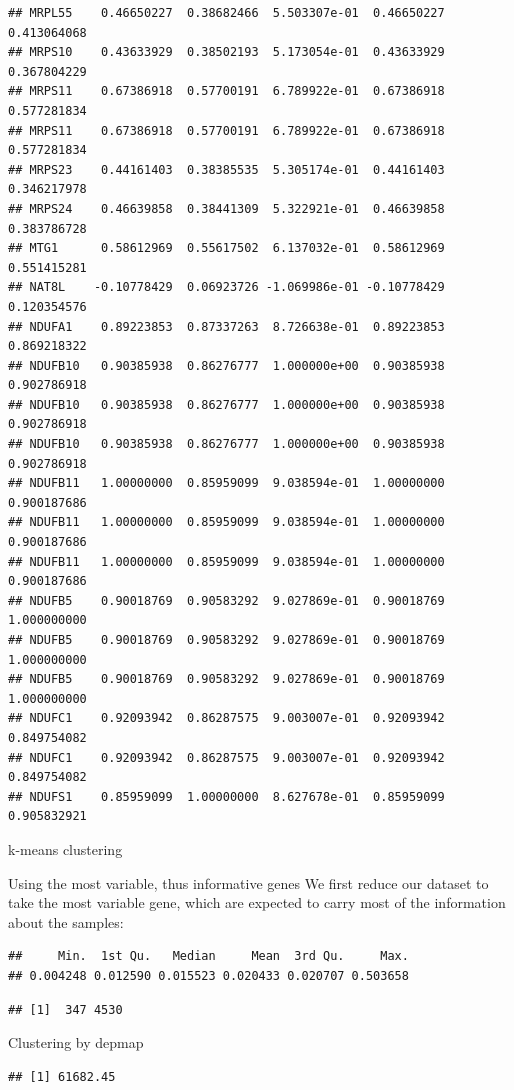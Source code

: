 \documentclass[
]{article}
\begin{document}
\begin{verbatim}
## MRPL55    0.46650227  0.38682466  5.503307e-01  0.46650227  0.413064068
## MRPS10    0.43633929  0.38502193  5.173054e-01  0.43633929  0.367804229
## MRPS11    0.67386918  0.57700191  6.789922e-01  0.67386918  0.577281834
## MRPS11    0.67386918  0.57700191  6.789922e-01  0.67386918  0.577281834
## MRPS23    0.44161403  0.38385535  5.305174e-01  0.44161403  0.346217978
## MRPS24    0.46639858  0.38441309  5.322921e-01  0.46639858  0.383786728
## MTG1      0.58612969  0.55617502  6.137032e-01  0.58612969  0.551415281
## NAT8L    -0.10778429  0.06923726 -1.069986e-01 -0.10778429  0.120354576
## NDUFA1    0.89223853  0.87337263  8.726638e-01  0.89223853  0.869218322
## NDUFB10   0.90385938  0.86276777  1.000000e+00  0.90385938  0.902786918
## NDUFB10   0.90385938  0.86276777  1.000000e+00  0.90385938  0.902786918
## NDUFB10   0.90385938  0.86276777  1.000000e+00  0.90385938  0.902786918
## NDUFB11   1.00000000  0.85959099  9.038594e-01  1.00000000  0.900187686
## NDUFB11   1.00000000  0.85959099  9.038594e-01  1.00000000  0.900187686
## NDUFB11   1.00000000  0.85959099  9.038594e-01  1.00000000  0.900187686
## NDUFB5    0.90018769  0.90583292  9.027869e-01  0.90018769  1.000000000
## NDUFB5    0.90018769  0.90583292  9.027869e-01  0.90018769  1.000000000
## NDUFB5    0.90018769  0.90583292  9.027869e-01  0.90018769  1.000000000
## NDUFC1    0.92093942  0.86287575  9.003007e-01  0.92093942  0.849754082
## NDUFC1    0.92093942  0.86287575  9.003007e-01  0.92093942  0.849754082
## NDUFS1    0.85959099  1.00000000  8.627678e-01  0.85959099  0.905832921
\end{verbatim}

k-means clustering

Using the most variable, thus informative genes We first reduce our
dataset to take the most variable gene, which are expected to carry most
of the information about the samples:

\begin{verbatim}
##     Min.  1st Qu.   Median     Mean  3rd Qu.     Max. 
## 0.004248 0.012590 0.015523 0.020433 0.020707 0.503658
\end{verbatim}

\begin{verbatim}
## [1]  347 4530
\end{verbatim}

Clustering by depmap

\begin{verbatim}
## [1] 61682.45
\end{verbatim}
\end{document}
